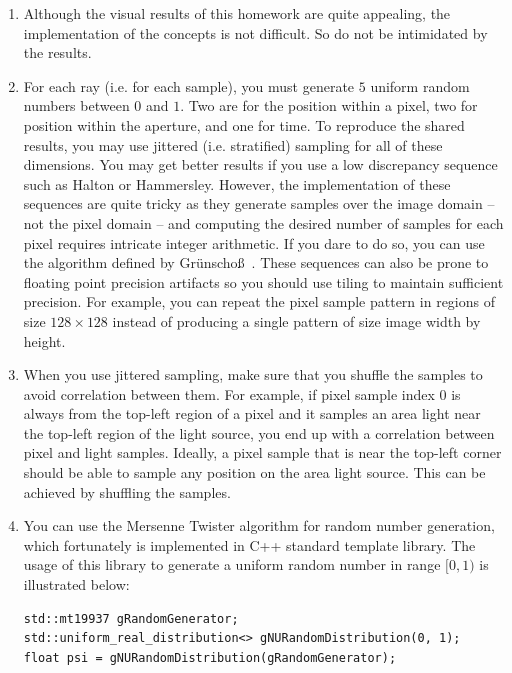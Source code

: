 \documentclass[12pt]{article}
\begin{document}
\begin{enumerate}
\item \textbf{} Although the visual results of this homework are quite
appealing, the implementation of the concepts is not difficult. So do
not be intimidated by the results.

\item \textbf{} For each ray (i.e. for each sample), you must generate
$5$ uniform random numbers between $0$ and $1$. Two are for the position
within a pixel, two for position within the aperture, and one for time.
To reproduce the shared results, you may use jittered (i.e. stratified) sampling for all
of these dimensions. You may get better results if you use a low
discrepancy sequence such as Halton or Hammersley. However,
the implementation of these sequences are quite tricky as they generate
samples over the image domain -- not the pixel domain -- and computing
the desired number of samples for each pixel requires intricate integer
arithmetic. If you dare to do so, you can use the algorithm defined by
Grünscho\ss~\cite{grunschloss2012enumerating}. These sequences can also
be prone to floating point precision artifacts so you should use tiling
to maintain sufficient precision. For example, you can repeat the pixel
sample pattern in regions of size $128\times128$ instead of producing a
single pattern of size image width by height.

\item \textbf{} When you use jittered sampling, make sure that you
shuffle the samples to avoid correlation between them. For example,
if pixel sample index $0$ is always from the top-left region of a
pixel and it samples an area light near the top-left
region of the light source, you end up with a correlation between pixel
and light samples. Ideally, a pixel sample that is near the top-left
corner should be able to sample any position on the area light source.
This can be achieved by shuffling the samples.

\item \textbf{} You can use the Mersenne Twister algorithm for random
number generation, which fortunately is implemented in 
C++ standard template library. The usage of this library to generate a
uniform random number in range $[0, 1)$ is illustrated below:

\begin{verbatim}
std::mt19937 gRandomGenerator;
std::uniform_real_distribution<> gNURandomDistribution(0, 1);
float psi = gNURandomDistribution(gRandomGenerator);
\end{verbatim}

\end{enumerate}
\end{document}
